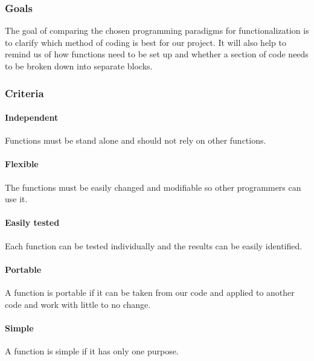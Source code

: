 \documentclass[10pt,letterpaper,onecolumn,draftclsnofoot]{IEEEtran}
\begin{document}
\subsubsection{Goals}
The goal of comparing the chosen programming paradigms for functionalization is to clarify which method of coding is best for our project. It will also help to remind us of how functions need to be set up and whether a section of code needs to be broken down into separate blocks.

\subsubsection{Criteria}
\paragraph{Independent}
Functions must be stand alone and should not rely on other functions.

\paragraph{Flexible}
The functions must be easily changed and modifiable so other programmers can use it.

\paragraph{Easily tested}
Each function can be tested individually and the results can be easily identified.

\paragraph{Portable}
A function is portable if it can be taken from our code and applied to another code and work with little to no change.

\paragraph{Simple}
A function is simple if it has only one purpose.
\end{document}
